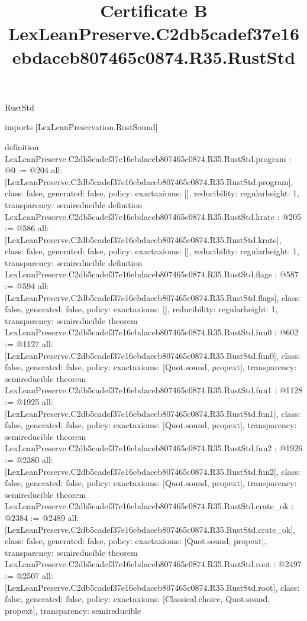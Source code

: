 \begin{lexlean}{RustStd}
\title{Certificate B LexLeanPreserve.C2db5cadef37e16ebdaceb807465c0874.R35.RustStd}
\begin{coremodule}
imports [LexLeanPreservation.RustSound]

definition LexLeanPreserve.C2db5cadef37e16ebdaceb807465c0874.R35.RustStd.program : @0 := @204 {
  all: [LexLeanPreserve.C2db5cadef37e16ebdaceb807465c0874.R35.RustStd.program],
  class: false,
  generated: false,
  policy: exact{axioms: []},
  reducibility: regular{height: 1},
  transparency: semireducible
}
definition LexLeanPreserve.C2db5cadef37e16ebdaceb807465c0874.R35.RustStd.krate : @205 := @586 {
  all: [LexLeanPreserve.C2db5cadef37e16ebdaceb807465c0874.R35.RustStd.krate],
  class: false,
  generated: false,
  policy: exact{axioms: []},
  reducibility: regular{height: 1},
  transparency: semireducible
}
definition LexLeanPreserve.C2db5cadef37e16ebdaceb807465c0874.R35.RustStd.flags : @587 := @594 {
  all: [LexLeanPreserve.C2db5cadef37e16ebdaceb807465c0874.R35.RustStd.flags],
  class: false,
  generated: false,
  policy: exact{axioms: []},
  reducibility: regular{height: 1},
  transparency: semireducible
}
theorem LexLeanPreserve.C2db5cadef37e16ebdaceb807465c0874.R35.RustStd.fun0 : @602 := @1127 {
  all: [LexLeanPreserve.C2db5cadef37e16ebdaceb807465c0874.R35.RustStd.fun0],
  class: false,
  generated: false,
  policy: exact{axioms: [Quot.sound, propext]},
  transparency: semireducible
}
theorem LexLeanPreserve.C2db5cadef37e16ebdaceb807465c0874.R35.RustStd.fun1 : @1128 := @1925 {
  all: [LexLeanPreserve.C2db5cadef37e16ebdaceb807465c0874.R35.RustStd.fun1],
  class: false,
  generated: false,
  policy: exact{axioms: [Quot.sound, propext]},
  transparency: semireducible
}
theorem LexLeanPreserve.C2db5cadef37e16ebdaceb807465c0874.R35.RustStd.fun2 : @1926 := @2380 {
  all: [LexLeanPreserve.C2db5cadef37e16ebdaceb807465c0874.R35.RustStd.fun2],
  class: false,
  generated: false,
  policy: exact{axioms: [Quot.sound, propext]},
  transparency: semireducible
}
theorem LexLeanPreserve.C2db5cadef37e16ebdaceb807465c0874.R35.RustStd.crate_ok : @2384 := @2489 {
  all: [LexLeanPreserve.C2db5cadef37e16ebdaceb807465c0874.R35.RustStd.crate_ok],
  class: false,
  generated: false,
  policy: exact{axioms: [Quot.sound, propext]},
  transparency: semireducible
}
theorem LexLeanPreserve.C2db5cadef37e16ebdaceb807465c0874.R35.RustStd.root : @2497 := @2507 {
  all: [LexLeanPreserve.C2db5cadef37e16ebdaceb807465c0874.R35.RustStd.root],
  class: false,
  generated: false,
  policy: exact{axioms: [Classical.choice, Quot.sound, propext]},
  transparency: semireducible
}


\end{coremodule}
\end{lexlean}
